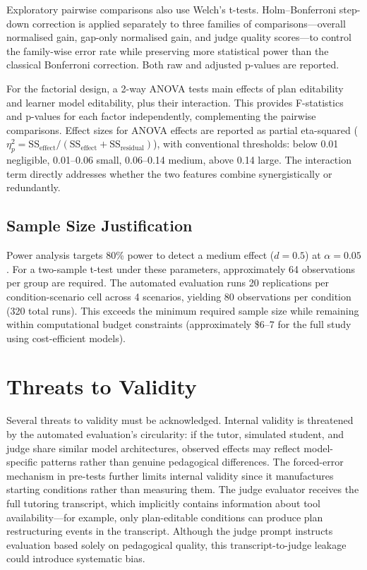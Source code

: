 \documentclass[logo,bsc,singlespacing,parskip,online]{infthesis}
\begin{document}
Exploratory pairwise comparisons also use Welch's t-tests. Holm--Bonferroni step-down correction \citep{holm1979simple} is applied separately to three families of comparisons---overall normalised gain, gap-only normalised gain, and judge quality scores---to control the family-wise error rate while preserving more statistical power than the classical Bonferroni correction. Both raw and adjusted p-values are reported.

For the factorial design, a 2-way ANOVA tests main effects of plan editability and learner model editability, plus their interaction. This provides F-statistics and p-values for each factor independently, complementing the pairwise comparisons. Effect sizes for ANOVA effects are reported as partial eta-squared ($\eta^2_p = \text{SS}_{\text{effect}} / (\text{SS}_{\text{effect}} + \text{SS}_{\text{residual}})$), with conventional thresholds: below 0.01 negligible, 0.01--0.06 small, 0.06--0.14 medium, above 0.14 large. The interaction term directly addresses whether the two features combine synergistically or redundantly.

\subsection{Sample Size Justification}

Power analysis targets 80\% power \citep{cohen1988power} to detect a medium effect ($d = 0.5$) at $\alpha = 0.05$. For a two-sample t-test under these parameters, approximately 64 observations per group are required. The automated evaluation runs 20 replications per condition-scenario cell across 4 scenarios, yielding 80 observations per condition (320 total runs). This exceeds the minimum required sample size while remaining within computational budget constraints (approximately \$6--7 for the full study using cost-efficient models).

\section{Threats to Validity}

Several threats to validity must be acknowledged. Internal validity is threatened by the automated evaluation's circularity: if the tutor, simulated student, and judge share similar model architectures, observed effects may reflect model-specific patterns rather than genuine pedagogical differences. The forced-error mechanism in pre-tests further limits internal validity since it manufactures starting conditions rather than measuring them. The judge evaluator receives the full tutoring transcript, which implicitly contains information about tool availability---for example, only plan-editable conditions can produce plan restructuring events in the transcript. Although the judge prompt instructs evaluation based solely on pedagogical quality, this transcript-to-judge leakage could introduce systematic bias.
\end{document}
